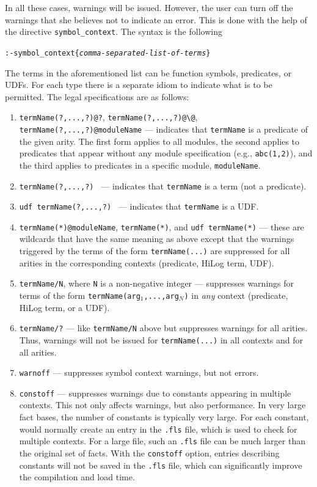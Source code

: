\documentclass[11pt]{article}
\newcommand{\ERGO}{\mbox{\smaller{\ensuremath{\cal{E}}\smaller{{\sc{RGO}}}}}\xspace}
\newcommand{\FLSYSTEM}{\ERGO}
\newcommand{\bs}{\textbackslash}
\begin{document}
In all these cases, warnings will be issued. However, the user can turn off
the warnings that she believes not to indicate an error. This is done with
the help of the directive
\texttt{symbol\_context}.  The syntax is the following
\begin{alltt}
:- symbol_context\{\textnormal{\emph{comma-separated-list-of-terms}}\}
\end{alltt}

The terms in the aforementioned list can be function symbols, predicates,
or UDFs. For each type there is a separate idiom to indicate what is to be
permitted.
The legal specifications are as follows:
\begin{enumerate}
\item \texttt{termName(?,...,?)@?}, \texttt{termName(?,...,?)@\bs{}@},
  \texttt{termName(?,...,?)@moduleName} --- indicates that
  \texttt{termName} is a predicate of the given arity. The first form
  applies to all modules,
  the second applies to predicates that appear without any module specification
  (e.g., \texttt{abc(1,2)}), and the third applies to predicates in a
  specific module, \texttt{moduleName}.  
\item {\tt termName(?,...,?) } --- indicates that \texttt{termName} is a
  term (not a predicate).
\item {\tt udf termName(?,...,?) } --- indicates that \texttt{termName}
  is a UDF.
\item \texttt{termName(*)@moduleName}, \texttt{termName(*)}, and \texttt{udf
    termName(*)} --- these are wildcards that have the same meaning as
  above except that the warnings triggered by the terms of the form
  \texttt{termName(...)}  are suppressed for all arities in the
  corresponding contexts (predicate, HiLog term, UDF).
\item \texttt{termName/N}, where \texttt{N} is a non-negative integer ---
  suppresses warnings for terms of the form
  \texttt{termName(arg$_1$,...,arg$_N$)} in \emph{any} context (predicate,
  HiLog term, or a UDF).
\item \texttt{termName/?} --- like \texttt{termName/N} above but suppresses
  warnings for all arities. Thus, warnings will not be issued for
  \texttt{termName(...)} in all contexts and for all arities.
\item \texttt{warnoff} --- suppresses symbol context warnings, but not errors.
\item \texttt{constoff} --- suppresses warnings due to constants appearing
  in multiple contexts. This not only affects warnings, but also performance.
  In very large fact bases, the number of constants is typically very large.
  For each constant, \FLSYSTEM would normally create an entry in the
  \texttt{.fls} file, which is used to check for multiple contexts.
  For a large file, such an \texttt{.fls} file can be much larger than the
  original set of facts. 
  With the \texttt{constoff} option, entries describing constants  will not be
  saved in the \texttt{.fls} file, which can significantly improve the
  compilation and load time. 
\end{enumerate}
\end{document}
